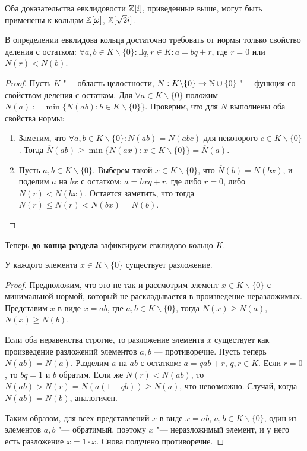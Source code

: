 \begin{note}
	Оба доказательства евклидовости $\mathbb{Z}[i]$, приведенные выше, могут быть применены к кольцам $\mathbb{Z}[\omega]$, $\mathbb{Z}[\sqrt{2}i]$.
\end{note}

\begin{proposition}
	В определении евклидова кольца достаточно требовать от нормы только свойство деления с остатком: $\forall a, b \in K\backslash\{0\}: \exists q, r \in K: a = bq + r$, где $r = 0$ или $N(r) < N(b)$.
\end{proposition}

\begin{proof}
	Пусть $K$ "--- область целостности, $N: K \backslash \{0\} \to \mathbb{N} \cup \{0\}$ "--- функция со свойством деления с остатком. Для $\forall a \in K \backslash \{0\}$ положим $\overline{N}(a) := \min\{N(ab) : b \in K \backslash \{0\}\}$. Проверим, что для $\overline{N}$ выполнены оба свойства нормы:
	\begin{enumerate}
		\item Заметим, что $\forall a, b \in K \backslash \{0\}: \overline{N}(ab) = N(abc)$ для некоторого $c \in K \backslash \{0\}$. Тогда $\overline{N}(ab) \ge \min\{N(ax) : x \in K \backslash \{0\}\} = \overline{N}(a)$.
		\item Пусть $a, b \in K \backslash \{0\}$. Выберем такой $x \in K \backslash \{0\}$, что $\overline{N}(b) = N(bx)$, и поделим $a$ на $bx$ с остатком: $a = bxq + r$, где либо $r = 0$, либо $N(r) < N(bx)$. Остается заметить, что тогда $\overline{N}(r) \le N(r) < N(bx) = \overline{N}(b)$.\qedhere
	\end{enumerate}
\end{proof}

Теперь \textbf{до конца раздела} зафиксируем евклидово кольцо $K$.

\begin{proposition}
	У каждого элемента $x \in K \backslash \{0\}$ существует разложение.
\end{proposition}

\begin{proof}
	Предположим, что это не так и рассмотрим элемент $x \in K \backslash \{0\}$ с минимальной нормой, который не раскладывается в произведение неразложимых. Представим $x$ в виде $x = ab$, где $a, b \in K \backslash \{0\}$, тогда $N(x) \ge N(a)$, $N(x) \ge N(b)$.
	
	Если оба неравенства строгие, то разложение элемента $x$ существует как произведение разложений элементов $a, b$ --- противоречие. Пусть теперь $N(ab) = N(a)$. Разделим $a$ на $ab$ с остатком: $a = qab + r$, $q, r \in K$. Если $r = 0$, то $bq = 1$ и $b$ обратим. Если же $N(r) < N(ab)$, то $N(ab) > N(r) = N(a(1 - qb)) \ge N(a)$, что невозможно. Случай, когда $N(ab) = N(b)$, аналогичен.
	
	Таким образом, для всех представлений $x$ в виде $x = ab$, $a, b \in K \backslash \{0\}$, один из элементов $a, b$ "--- обратимый, поэтому $x$ "--- неразложимый элемент, и у него есть разложение $x = 1 \cdot x$. Снова получено противоречие.
\end{proof}

